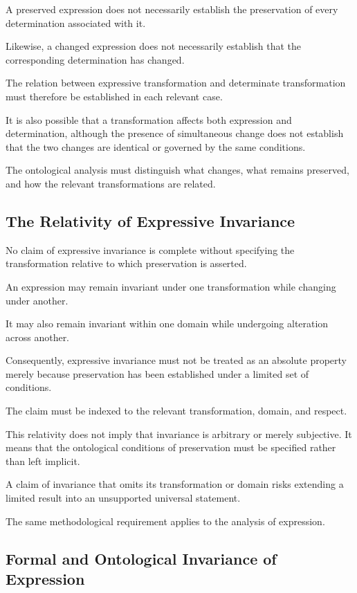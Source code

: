 A preserved expression does not necessarily establish
the preservation of every determination associated
with it.

Likewise, a changed expression does not necessarily
establish that the corresponding determination
has changed.

The relation between expressive transformation
and determinate transformation must therefore
be established in each relevant case.

It is also possible that a transformation affects
both expression and determination, although the
presence of simultaneous change does not establish
that the two changes are identical or governed
by the same conditions.

The ontological analysis must distinguish what
changes, what remains preserved, and how the
relevant transformations are related.

\subsection{The Relativity of Expressive Invariance}

No claim of expressive invariance is complete
without specifying the transformation relative
to which preservation is asserted.

An expression may remain invariant under one
transformation while changing under another.

It may also remain invariant within one domain
while undergoing alteration across another.

Consequently, expressive invariance must not
be treated as an absolute property merely because
preservation has been established under a limited
set of conditions.

The claim must be indexed to the relevant
transformation, domain, and respect.

This relativity does not imply that invariance
is arbitrary or merely subjective. It means that
the ontological conditions of preservation must
be specified rather than left implicit.

A claim of invariance that omits its transformation
or domain risks extending a limited result into
an unsupported universal statement.

The same methodological requirement applies
to the analysis of expression.

\subsection{Formal and Ontological Invariance of Expression}

